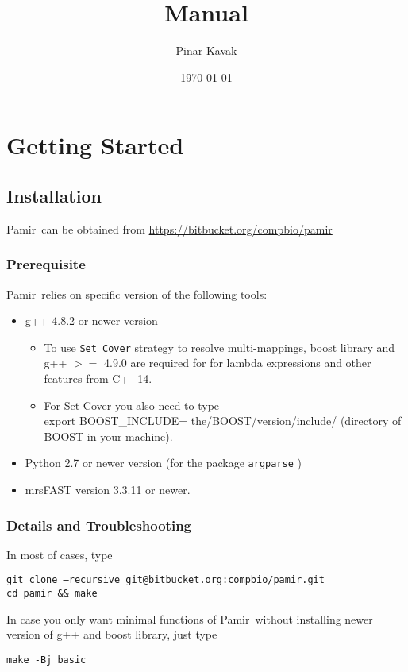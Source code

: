 \documentclass{article}
\title{\toolName Manual}
\author{Pinar Kavak}
\date{\today}
\makeatletter
\newcommand{\toolName}{Pamir~}
\newcommand{\gitUrl}{https://bitbucket.org/compbio/pamir}
\newcommand{\gitClone}{git@bitbucket.org:compbio/pamir.git}
\makeatother
\begin{document}
\maketitle

\tableofcontents
\newpage

\section{Getting Started}

\subsection{Installation}
\toolName can be obtained from \url{\gitUrl}

\subsubsection{Prerequisite}
\toolName relies on specific version of the following tools:
\begin{itemize}
\item g++ 4.8.2 or newer version
\begin{itemize}
\item To use \texttt{Set Cover} strategy to resolve multi-mappings, boost library and g++ $>=$ 4.9.0 are required for for lambda expressions and other features from C++14.
\item For Set Cover you also need to type \\
export BOOST\_INCLUDE= the/BOOST/version/include/ (directory of BOOST in your machine).

\end{itemize}
\item Python 2.7 or newer version (for the package \texttt{argparse} )
\item mrsFAST version 3.3.11 or newer.
\end{itemize}

\subsubsection{Details and Troubleshooting}
In most of cases, type 

\begin{flushleft}
\texttt{git clone --recursive \gitClone}\\
\texttt{cd pamir \&\& make}
\end{flushleft}


In case you only want minimal functions of \toolName without installing newer version of g++ and boost library, just type
\begin{flushleft}
\texttt{make -Bj basic}
\end{flushleft}
  
\end{document}
